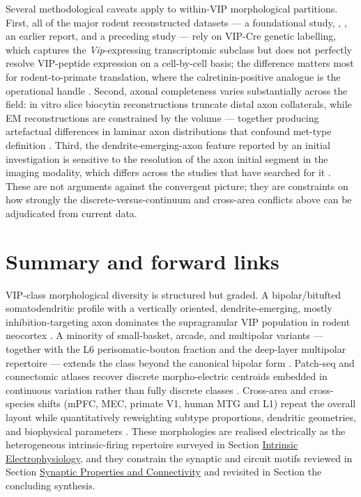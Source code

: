 \documentclass[11pt]{article}
\begin{document}
Several methodological caveats apply to within-VIP morphological partitions. First, all of the major rodent reconstructed datasets --- a foundational study, \citet{Gouwens2019}, \citet{Gouwens2020a}, an earlier report, and a preceding study --- rely on VIP-Cre genetic labelling, which captures the \textit{Vip}-expressing transcriptomic subclass but does not perfectly resolve VIP-peptide expression on a cell-by-cell basis; the difference matters most for rodent-to-primate translation, where the calretinin-positive analogue is the operational handle \citep{Medalla2023, Hodge2019, Fishell2020}. Second, axonal completeness varies substantially across the field: in vitro slice biocytin reconstructions truncate distal axon collaterals, while EM reconstructions are constrained by the volume --- together producing artefactual differences in laminar axon distributions that confound met-type definition \citep{Gouwens2020a, Schneidermizell2025, Elabbady2025, Gliko2024}. Third, the dendrite-emerging-axon feature reported by an initial investigation is sensitive to the resolution of the axon initial segment in the imaging modality, which differs across the studies that have searched for it \citep{Badrinarayanan2021}. These are not arguments against the convergent picture; they are constraints on how strongly the discrete-versus-continuum and cross-area conflicts above can be adjudicated from current data.

\section{Summary and forward links}

VIP-class morphological diversity is structured but graded. A bipolar/bitufted somatodendritic profile with a vertically oriented, dendrite-emerging, mostly inhibition-targeting axon dominates the supragranular VIP population in rodent neocortex \citep{Kawaguchi1996, Pronneke2015, Apicella2022, Schneidermizell2025}. A minority of small-basket, arcade, and multipolar variants --- together with the L6 perisomatic-bouton fraction and the deep-layer multipolar repertoire --- extends the class beyond the canonical bipolar form \citep{Rudy2011, Zhou2017, Apicella2022, Yayon2023}. Patch-seq and connectomic atlases recover discrete morpho-electric centroids embedded in continuous variation rather than fully discrete classes \citep{Gouwens2020a, Gouwens2020b, Gliko2024, Schneidermizell2025}. Cross-area and cross-species shifts (mPFC, MEC, primate V1, human MTG and L1) repeat the overall layout while quantitatively reweighting subtype proportions, dendritic geometries, and biophysical parameters \citep{Moreno2026, Badrinarayanan2021, Medalla2023, Chartrand2023}. These morphologies are realised electrically as the heterogeneous intrinsic-firing repertoire surveyed in Section \href{/electrophysiology}{Intrinsic Electrophysiology}, and they constrain the synaptic and circuit motifs reviewed in Section \href{/synaptic-properties}{Synaptic Properties and Connectivity} and revisited in Section the concluding synthesis.
\end{document}
